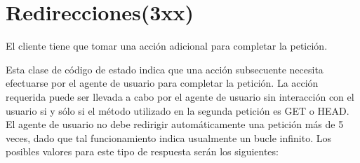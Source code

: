 \section{Redirecciones(3xx)}
El cliente tiene que tomar una acción adicional para completar la petición.
\bigskip
\par
Esta clase de código de estado indica que una acción subsecuente necesita efectuarse por el agente de usuario para completar la petición. La acción requerida puede ser llevada a cabo por el agente de usuario sin interacción con el usuario si y sólo si el método utilizado en la segunda petición es GET o HEAD. El agente de usuario no debe redirigir automáticamente una petición más de 5 veces, dado que tal funcionamiento indica usualmente un bucle infinito. Los posibles valores para este tipo de respuesta serán los siguientes:
\bigskip
\par
